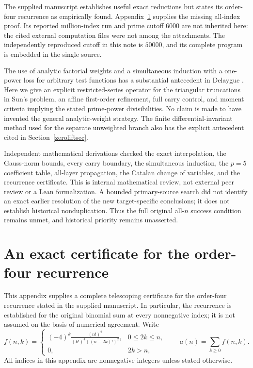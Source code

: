 \documentclass[11pt,a4paper]{article}
\theoremstyle{remark}\newtheorem{remark}[theorem]{Remark}
\begin{document}
The supplied manuscript \cite{Supplied} establishes useful exact
reductions but states its order-four recurrence as empirically found.
Appendix~\ref{rec:section} supplies the missing all-index proof.
Its reported million-index run and prime cutoff \(6000\) are not inherited
here: the cited external computation files were not among the attachments.
The independently reproduced cutoff in this note is \(50000\), and its
complete program is embedded in the single source.

The use of analytic factorial weights and a simultaneous induction
with a one-power loss for arbitrary test functions has a substantial
antecedent in Delaygue \cite[Theorem 1, Proposition 1, and
Sections 3.3--4.3]{Delaygue}. Here we give an explicit restricted-series
operator for the triangular truncations in Sun's problem, an affine
first-order refinement, full carry control, and moment criteria implying
the stated prime-power divisibilities. No claim is made to have invented
the general analytic-weight strategy. The finite differential-invariant
method used for the separate unweighted branch also has the explicit
antecedent cited in Section~\ref{zeroliftsec}.

Independent mathematical derivations checked the exact interpolation,
the Gauss-norm bounds, every carry boundary, the simultaneous induction,
the \(p=5\) coefficient table, all-layer propagation, the Catalan change of
variables, and the recurrence certificate. This is internal mathematical
review, not external peer review or a Lean formalization.
A bounded primary-source search did not identify an exact earlier
resolution of the new target-specific conclusions; it does not establish
historical nonduplication. Thus the full original all-\(n\) success
condition remains unmet, and historical priority remains unasserted.

\appendix
\section{An exact certificate for the order-four recurrence}
\label{rec:section}

This appendix supplies a complete telescoping certificate for the
order-four recurrence stated in the supplied manuscript.  In particular,
the recurrence is established for the original binomial sum at every
nonnegative index; it is not assumed on the basis of numerical agreement.
Write
\begin{equation}\label{rec:summand}
 f(n,k)=
 \begin{cases}
 \displaystyle(-4)^k\frac{(n!)^2}{(k!)^4((n-2k)!)^2},&0\leq 2k\leq n,\\[4pt]
 0,&2k>n,
 \end{cases}
 \qquad a(n)=\sum_{k\geq0}f(n,k).
\end{equation}
All indices in this appendix are nonnegative integers unless stated
otherwise.
\end{document}
